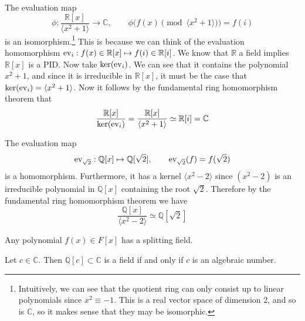   \begin{example}
    The evaluation map 
    \begin{equation}
      \phi: \frac{\mathbb{R}[x]}{\langle x^2 + 1 \rangle} \rightarrow \mathbb{C}, \qquad \phi\big( f(x) \pmod{\langle x^2 + 1 \rangle} \big) = f(i)
    \end{equation}
    is an isomorphism.\footnote{Intuitively, we can see that the quotient ring can only consist up to linear polynomials since $x^2 \equiv -1$. This is a real vector space of dimension $2$, and so is $\mathbb{C}$, so it makes sense that they may be isomorphic. } This is because we can think of the evaluation homomorphism $\operatorname{ev}_i : f(x) \in \mathbb{R}[x] \mapsto f(i) \in \mathbb{R}[i]$. We know that $\mathbb{R}$ a field implies $\mathbb{R}[x]$ is a PID. Now take $\ker(\operatorname{ev}_i)$. We can see that it contains the polynomial $x^2 + 1$, and since it is irreducible in $\mathbb{R}[x]$, it must be the case that $\ker(\operatorname{ev}_i) = \langle x^2 + 1 \rangle$. Now it follows by the fundamental ring homomorphism theorem that 
    \begin{equation}
      \frac{\mathbb{R}[x]}{\ker(\operatorname{ev}_i)} = \frac{\mathbb{R}[x]}{\langle x^2 + 1 \rangle} \simeq \mathbb{R}[i] = \mathbb{C}
    \end{equation}
  \end{example} 

  \begin{example}
    The evaluation map 
    \begin{equation}
      \operatorname{ev}_{\sqrt{2}}: \mathbb{Q}[x] \mapsto \mathbb{Q}[\sqrt{2}], \qquad \operatorname{ev}_{\sqrt{2}} (f) = f(\sqrt{2}) 
    \end{equation}
    is a homomorphism. Furthermore, it has a kernel $\langle x^2 - 2 \rangle$ since $(x^2 - 2)$ is an irreducible polynomial in $\mathbb{Q}[x]$ containing the root $\sqrt{2}$. Therefore by the fundamental ring homomorphism theorem we have 
    \begin{equation}
      \frac{\mathbb{Q}[x]}{\langle x^2 - 2 \rangle} \simeq \mathbb{Q}[\sqrt{2}]
    \end{equation}
  \end{example} 

  \begin{corollary}
    Any polynomial $f(x) \in F[x]$ has a splitting field. 
  \end{corollary}

  \begin{corollary}
    Let $c \in \mathbb{C}$. Then $\mathbb{Q}[c] \subset \mathbb{C}$ is a field if and only if $c$ is an algebraic number. 
  \end{corollary}

